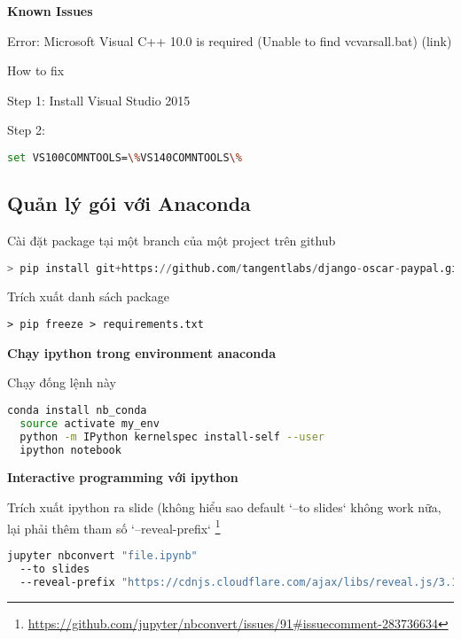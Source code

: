 \textbf{Known Issues}

Error: Microsoft Visual C++ 10.0 is required (Unable to find vcvarsall.bat) (link)

How to fix


Step 1: Install Visual Studio 2015

Step 2:

\begin{lstlisting}[language=bash]
set VS100COMNTOOLS=\%VS140COMNTOOLS\%
\end{lstlisting}

\subsection{Quản lý gói với Anaconda}

\noindent Cài đặt package tại một branch của một project trên github

\begin{lstlisting}[language=Python]
> pip install git+https://github.com/tangentlabs/django-oscar-paypal.git@issue/34/oscar-0.6#egg=django-oscar-paypal
\end{lstlisting}

\noindent Trích xuất danh sách package

\begin{lstlisting}
> pip freeze > requirements.txt
\end{lstlisting}

\noindent \textbf{Chạy ipython trong environment anaconda}

\noindent Chạy đống lệnh này

\begin{lstlisting}[language=bash]
  conda install nb_conda
  source activate my_env
  python -m IPython kernelspec install-self --user
  ipython notebook
\end{lstlisting}

\noindent \textbf{Interactive programming với ipython}

\noindent Trích xuất ipython ra slide (không hiểu sao default `--to slides` không work nữa, lại phải thêm tham số `--reveal-prefix` \footnote{\href{https://github.com/jupyter/nbconvert/issues/91#issuecomment-283736634}{https://github.com/jupyter/nbconvert/issues/91#issuecomment-283736634}}

\begin{lstlisting}[language=bash]
jupyter nbconvert "file.ipynb"
  --to slides
  --reveal-prefix "https://cdnjs.cloudflare.com/ajax/libs/reveal.js/3.1.0"
\end{lstlisting}

